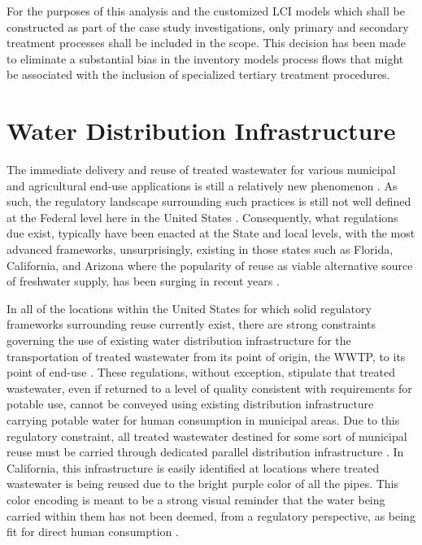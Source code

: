 For the purposes of this analysis and the customized LCI models which shall be constructed as part of the case study investigations, only primary and secondary treatment processes shall be included in the scope. This decision has been made to eliminate a substantial bias in the inventory models process flows that might be associated with the inclusion of specialized tertiary treatment procedures.  

\section{Water Distribution Infrastructure}

The immediate delivery and reuse of treated wastewater for various municipal and agricultural end-use applications is still a relatively new phenomenon \cite{Association2011, Bixio2008}. As such, the regulatory landscape surrounding such practices is still not well defined at the Federal level here in the United States \cite{Asano2007}. Consequently, what regulations due exist, typically have been enacted at the State and local levels, with the most advanced frameworks, unsurprisingly, existing in those states such as Florida, California, and Arizona where the popularity of reuse as viable alternative source of freshwater supply, has been surging in recent years \cite{CDWR2003,Lofman2010a,Rodrigo2012,Younos2014}.

In all of the locations within the United States for which solid regulatory frameworks surrounding reuse currently exist, there are strong constraints governing the use of existing water distribution infrastructure for the transportation of treated wastewater from its point of origin, the WWTP, to its point of end-use \cite{Daughton2004,WorldHealthOrganization2006,CDHS2011}. These regulations, without exception, stipulate that treated wastewater, even if returned to a level of quality consistent with requirements for potable use, cannot be conveyed using existing distribution infrastructure carrying potable water for human consumption in municipal areas. Due to this regulatory constraint, all treated wastewater destined for some sort of municipal reuse must be carried through dedicated parallel distribution infrastructure \cite{CDWR2003}. In California, this infrastructure is easily identified at locations where treated wastewater is being reused due to the bright purple color of all the pipes. This color encoding is meant to be a strong visual reminder that the water being carried within them has not been deemed, from a regulatory perspective, as being fit for direct human consumption \cite{CDHS2001,USEPA2012}. 


